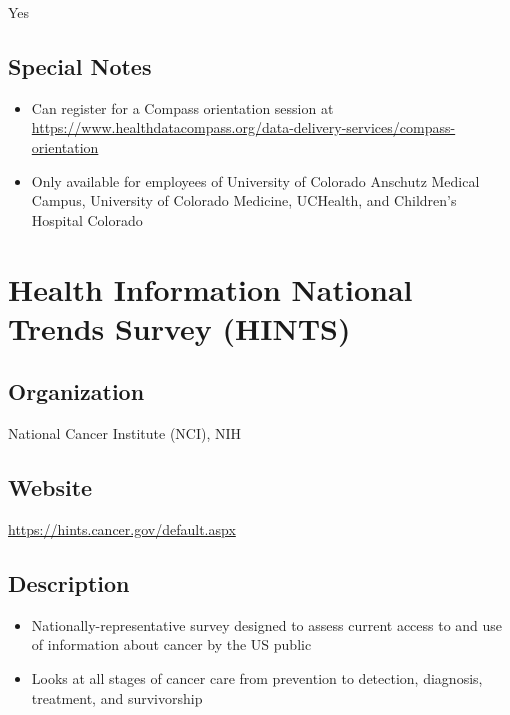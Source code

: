 \documentclass[
]{book}
\providecommand{\tightlist}{%
  \setlength{\itemsep}{0pt}\setlength{\parskip}{0pt}}
\begin{document}
Yes

\hypertarget{special-notes-31}{%
\section{Special Notes}\label{special-notes-31}}

\begin{itemize}
\tightlist
\item
  Can register for a Compass orientation session at \url{https://www.healthdatacompass.org/data-delivery-services/compass-orientation}
\item
  Only available for employees of University of Colorado Anschutz Medical Campus, University of Colorado Medicine, UCHealth, and Children's Hospital Colorado
\end{itemize}

\mainmatter

\hypertarget{health-information-national-trends-survey-hints}{%
\chapter{Health Information National Trends Survey (HINTS)}\label{health-information-national-trends-survey-hints}}

\hypertarget{organization-32}{%
\section{Organization}\label{organization-32}}

National Cancer Institute (NCI), NIH

\hypertarget{website-32}{%
\section{Website}\label{website-32}}

\url{https://hints.cancer.gov/default.aspx}

\hypertarget{description-32}{%
\section{Description}\label{description-32}}

\begin{itemize}
\tightlist
\item
  Nationally-representative survey designed to assess current access to and use of information about cancer by the US public
\item
  Looks at all stages of cancer care from prevention to detection, diagnosis, treatment, and survivorship
\end{itemize}
\end{document}
